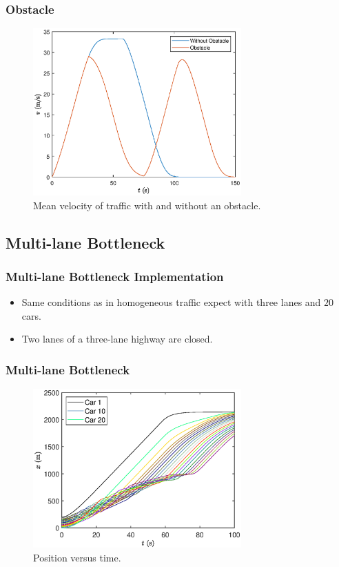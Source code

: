 \documentclass{beamer}
\begin{document}
\begin{frame}
  \frametitle{Obstacle}
  \begin{figure}[H]
    \includegraphics[width=8cm]{BottleNeck7.eps}
    \caption{Mean velocity of traffic with and without an obstacle.}
  \end{figure}
\end{frame}


\subsection{Multi-lane Bottleneck}

\begin{frame}
  \frametitle{Multi-lane Bottleneck Implementation}
  \begin{itemize}
    \item Same conditions as in homogeneous traffic expect with three lanes and $20$ cars.
    \item Two lanes of a three-lane highway are closed. 
  \end{itemize}
\end{frame}

\begin{frame}
  \frametitle{Multi-lane Bottleneck}
  \begin{figure}[H]
    \includegraphics[width=8cm]{mlbn_x.eps}
    \caption{Position versus time.} 
\end{figure}
\end{frame}
\end{document}
